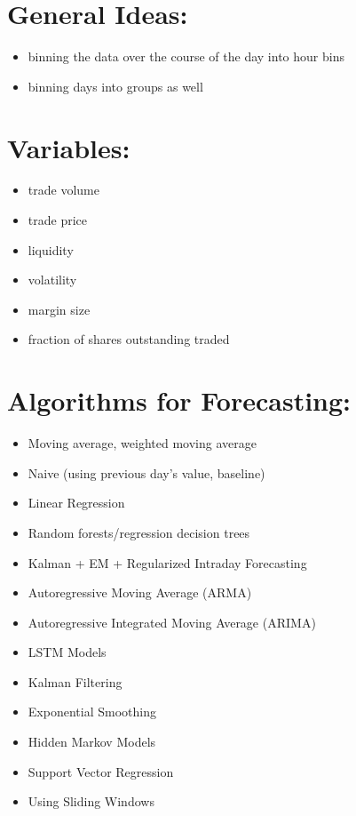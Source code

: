 \documentclass[11pt]{article}
\begin{document}
\section{General Ideas:}
\begin{itemize}
\setlength{\itemsep}{0pt}
  \setlength{\parskip}{0pt}
\item binning the data over the course of the day into hour bins
\item binning days into groups as well
\end{itemize}


\section{Variables:}
\begin{itemize}
\setlength{\itemsep}{0pt}
  \setlength{\parskip}{0pt}
\item trade volume
\item trade price
\item liquidity
\item volatility
\item margin size
\item fraction of shares outstanding traded
\end{itemize}


\section{Algorithms for Forecasting:}
\begin{itemize}
\setlength{\itemsep}{0pt}
  \setlength{\parskip}{0pt}
\item Moving average, weighted moving average
\item Naive (using previous day's value, baseline)
\item Linear Regression
\item Random forests/regression decision trees
\item Kalman + EM + Regularized Intraday Forecasting
\item Autoregressive Moving Average (ARMA)
\item Autoregressive Integrated Moving Average (ARIMA)
\item LSTM Models
\item Kalman Filtering
\item Exponential Smoothing
\item Hidden Markov Models
\item Support Vector Regression
\item Using Sliding Windows
\end{itemize}
\end{document}
